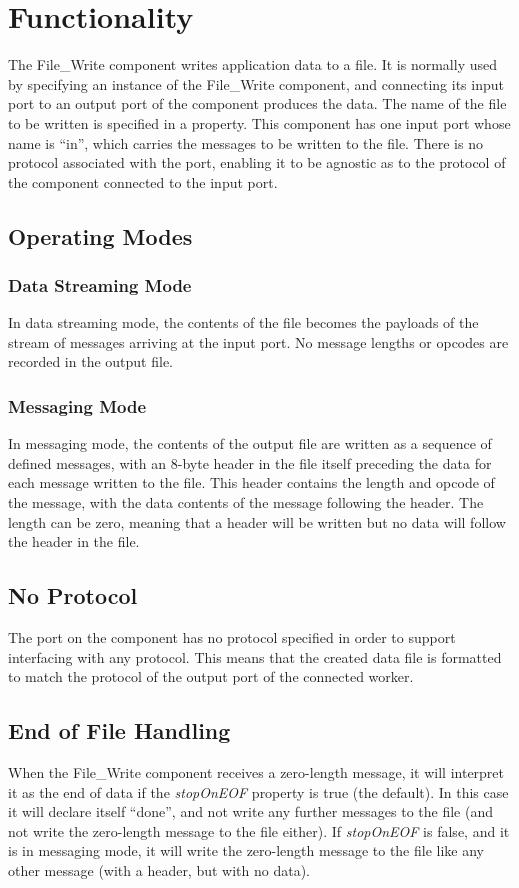 \documentclass{article}
\begin{document}
\section*{Functionality}
\begin{flushleft}
The File\_Write component writes application data to a file. It is normally used by
specifying an instance of the File\_Write component, and connecting its input port to an
output port of the component produces the data. The name of the file to be written is
specified in a property.
This component has one input port whose name is ``in'', which carries the messages to
be written to the file. There is no protocol associated with the port, enabling it to be
agnostic as to the protocol of the component connected to the input port.
\subsection*{Operating Modes}
\subsubsection*{Data Streaming Mode}
In data streaming mode, the contents of the file becomes the payloads of the stream of
messages arriving at the input port. No message lengths or opcodes are recorded in
the output file.
\subsubsection*{Messaging Mode}
In messaging mode, the contents of the output file are written as a sequence of defined
messages, with an 8-byte header in the file itself preceding the data for each message
written to the file. This header contains the length and opcode of the message, with the
data contents of the message following the header. The length can be zero, meaning
that a header will be written but no data will follow the header in the file.\\
\medskip \medskip

\subsection*{No Protocol}
The port on the component has no protocol specified in order to support interfacing with any protocol.  This means that the created data file is formatted to match the protocol of the output port of the connected worker.
\subsection*{End of File Handling}
When the File\_Write component receives a zero-length message, it will interpret it as
the end of data if the \textit{stopOnEOF} property is true (the default). In this case it will
declare itself ``done'', and not write any further messages to the file (and not write the
zero-length message to the file either). If \textit{stopOnEOF} is false, and it is in messaging mode, it will write the zero-length message to the file like any other message (with a
header, but with no data).

\end{flushleft}
\end{document}
